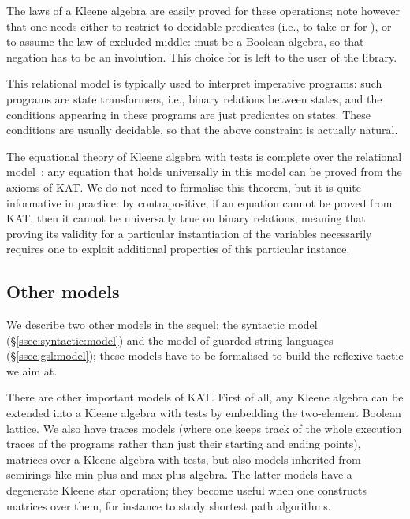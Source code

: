 \documentclass[a4paper]{llncs}
\newif\iflong\longfalse
\begin{document}
The laws of a Kleene algebra are easily proved for these operations;
note however that one needs either to restrict to decidable predicates
(i.e., to take \coqe or \coqe for ), or to assume
the law of excluded middle:  must be a Boolean algebra, so that
negation has to be an involution. This choice for  is left to the
user of the library.


This relational model is typically used to interpret imperative
programs: such programs are state transformers, i.e., binary relations
between states, and the conditions appearing in these programs are
just predicates on states. These conditions are usually decidable, so
that the above constraint is actually natural.


The equational theory of Kleene algebra with tests is complete over
the relational model~\cite{kozens96:kat:completeness:decidability}:
any equation  that holds universally in this model can be proved
from the axioms of KAT. We do not need to formalise this theorem, but it is quite informative in
practice: by contrapositive, if an equation cannot be proved from KAT,
then it cannot be universally true on binary relations, meaning that
proving its validity for a particular instantiation of the variables
necessarily requires one to exploit additional properties of this
particular instance.


\subsection{Other models}
\label{ssec:other:models}

We describe two other models in the sequel: the syntactic model
(§\ref{ssec:syntactic:model}) and the model of guarded string
languages (§\ref{ssec:gsl:model}); these models have to be formalised
to build the reflexive tactic we aim at. 

There are other important models of KAT. First of all, any Kleene
algebra can be extended into a Kleene algebra with tests by embedding
the two-element Boolean lattice. We also have traces models (where one
keeps track of the whole execution traces of the programs rather than
just their starting and ending points), matrices over a Kleene algebra
with tests, but also models inherited from semirings like min-plus and
max-plus algebra\iflong, or convex-polygon semirings~\cite{IwanoS90}\fi. The latter
models have a degenerate Kleene star operation; they become useful
when one constructs matrices over them, for instance to study shortest
path algorithms.
\end{document}
